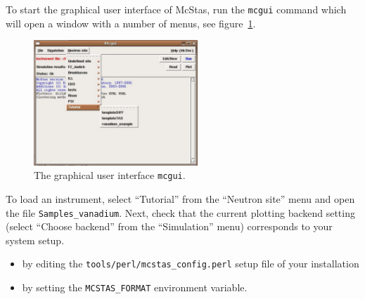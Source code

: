 To start the graphical user interface of McStas, run the
\verb+mcgui+ command which will open a window
with a number of menus,
see figure~\ref{fig:mcgui}. 
\begin{figure}[htb!]
  \begin{center}
    \includegraphics[width=0.55\textwidth]{figures/mcgui}
  \end{center}
\caption{The graphical user interface \texttt{mcgui}.}
\label{fig:mcgui}
\end{figure}
\label{p:neutronsite}
To load an instrument, select ``Tutorial'' from the ``Neutron site''
menu and open the file \verb+Samples_vanadium+. Next, check that the current plotting backend setting
(select ``Choose backend'' from the ``Simulation'' menu) corresponds
to your system setup.
\begin{itemize}
\item{by editing
the \verb+tools/perl/mcstas_config.perl+ setup file of your
installation}
\item{by setting the \verb+MCSTAS_FORMAT+ environment
variable.}
\end{itemize} 

